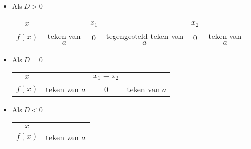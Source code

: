 \begin{itemize}
\item Als $D>0$ \\
\begin{center}
	\begin{tabular}{c||c|c|c|c|c}
$x$ &  & $x_{1}$ &  & $x_{2}$ & \\
\hline 
$f(x)$ & teken van $a$ & 0 & tegengesteld teken van $a$ & 0 & teken van $a$\\
\end{tabular}
\end{center}
\item Als $D=0$ \\
\begin{center}
	\begin{tabular}{c||c|c|c}
	$x$ &  & $x_{1}=x_{2}$ & \\
	\hline 
	$f(x)$ & teken van $a$ & 0 & teken van $a$\\
\end{tabular}
\end{center}
\item Als $D<0$ \\
\begin{center}
	\begin{tabular}{c||c}
$x$ & \\
\hline 
$f(x)$ & teken van $a$\\
\end{tabular}
\end{center}
\end{itemize}


